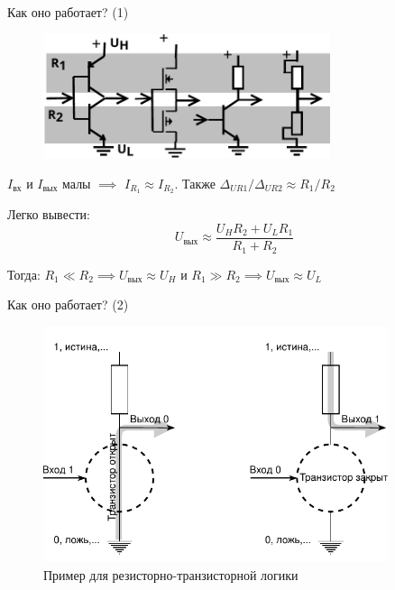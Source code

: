 \documentclass[xetex,aspectratio=43]{beamer}
\begin{document}
\begin{frame}{Как оно работает? (1)}
    \begin{figure}
        \includegraphics[width=0.75\textwidth]{img/07.R-R.pdf}
    \end{figure}

\(I_\text{вх}\) и \(I_\text{вых}\) малы \(\implies\) \(I_{R_1} \approx I_{R_2}\).
Также \(\Delta_{U R1} / \Delta_{U R2} \approx R_1 / R_2\)

Легко вывести:
\[U_\text{вых} \approx \frac{U_H R_2 + U_L R_1}{R_1 + R_2}\]

Тогда: \(R_1 \ll R_2 \implies U_\text{вых} \approx U_H\) и \(R_1 \gg R_2 \implies U_\text{вых} \approx U_L\)
\end{frame}

\begin{frame}{Как оно работает? (2)}
    \begin{figure}
    \includegraphics[width=0.9\textwidth]{img/07.not_resist_physics.pdf}
    \caption{Пример для резисторно-транзисторной логики}
    \end{figure}
\end{frame}
\end{document}
